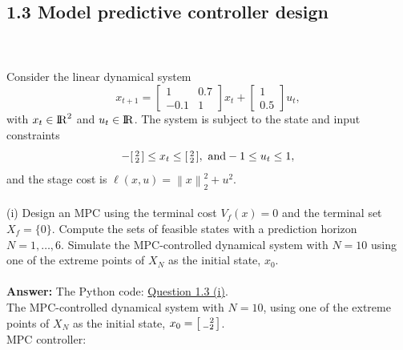 \documentclass[a4paper,11pt,reqno]{amsart}
\newcommand{\R}{{\rm I\!R}}
\begin{document}
\subsection*{1.3 Model predictive controller design}
\
\\ \\
Consider the linear dynamical system
\begin{equation}
    x_{t+1}=
    \begin{bmatrix}
        1&0.7\\
        -0.1&1
    \end{bmatrix}
    x_t+
    \begin{bmatrix}
        1\\
        0.5
    \end{bmatrix}
    u_t,
\end{equation}
with $x_t\in\R^2$ and $u_t\in\R$. The system is subject to the state and input constraints
\begin{equation}
    -
    \begin{bsmallmatrix}
        2\\
        2
    \end{bsmallmatrix}
    \leq x_t\leq
    \begin{bsmallmatrix}
        2\\
        2
    \end{bsmallmatrix},\
    \text{and} -1\leq u_t\leq 1,
    \label{eq:q2_constraints}
\end{equation}
and the stage cost is $\ell(x,u)=\left\lVert x\right\rVert ^2_2+u^2$.
\\ \\
(i) Design an MPC using the terminal cost $V_f(x)=0$ and the terminal set $X_f=\{0\}$. Compute the 
sets of feasible states with a prediction horizon $N=1,\ldots,6.$ Simulate the MPC-controlled dynamical 
system with $N=10$ using one of the extreme points of $X_N$ as the initial state, $x_0$.
\\ \\
\textbf{Answer:} 
The Python code: \href{https://github.com/Gczmy/ELE8088/blob/main/Coursework1/Python_code/3_i.py}{Question 1.3 (i)}.
\\
The MPC-controlled dynamical system with $N=10$, using one of the extreme points of $X_N$ as the initial state, $x_0=\begin{bsmallmatrix}\ \ 2\\-2\end{bsmallmatrix}$.
\\
MPC controller:
\end{document}
